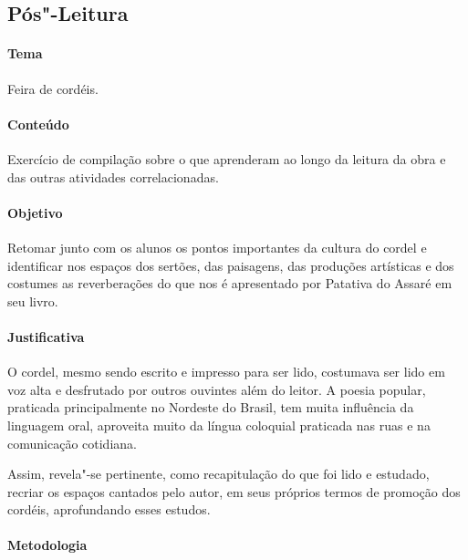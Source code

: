 \documentclass[12pt]{extarticle}
\begin{document}

\subsection{Pós"-Leitura}

\paragraph{Tema} Feira de cordéis.

\paragraph{Conteúdo} Exercício de compilação sobre o que aprenderam ao 
longo da leitura da obra e das outras atividades correlacionadas. 

\paragraph{Objetivo} Retomar junto com os alunos os pontos importantes 
da cultura do cordel e identificar nos espaços dos sertões, das paisagens, 
das produções artísticas e dos costumes as reverberações do que nos 
é apresentado por Patativa do Assaré em seu livro. 

\paragraph{Justificativa} O cordel, mesmo sendo escrito e impresso para 
ser lido, costumava ser lido em voz alta e desfrutado por outros ouvintes
além do leitor. A poesia popular, praticada principalmente
no Nordeste do Brasil, tem muita influência da linguagem
oral, aproveita muito da língua coloquial praticada nas ruas
e na comunicação cotidiana.

Assim, revela"-se pertinente, como recapitulação do que foi lido e 
estudado, recriar os espaços cantados pelo autor, em seus próprios termos 
de promoção dos cordéis, aprofundando esses estudos.

\paragraph{Metodologia}
\end{document}
